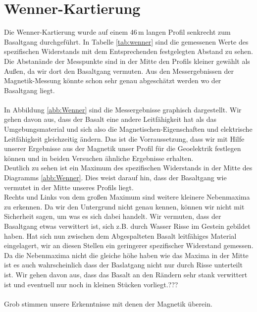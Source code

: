 

\section{Wenner-Kartierung}
Die Wenner-Kartierung wurde auf einem 46\,m langen Profil senkrecht zum Basaltgang durchgeführt. In Tabelle \ref{tab:wenner} sind die gemessenen Werte des spezifischen Widerstands mit dem Entsprechenden festgelegten Abstand zu sehen. Die Abstanände
der Messpunkte sind in der Mitte den Profils kleiner gewählt als Außen, da wir dort den Basaltgang vermuten. Aus den Messergebnissen der Magnetik-Messung könnte schon sehr genau abgeschätzt werden wo der Basaltgang liegt.\\
\\
In Abbildung \ref{abb:Wenner} sind die Messergebnisse graphisch dargestellt. Wir gehen davon aus, dass der Basalt eine andere Leitfähigkeit hat als das Umgebungsmaterial und sich also die Magnetischen-Eigenschaften und elektrische Leitfähigkeit 
gleichzeitig ändern. Das ist die Vorraussetzung, dass wir mit Hilfe unserer Ergebnisse aus der Magnetik unser Profil für die Geoelektrik festlegen können und in beiden Versuchen ähnliche Ergebnisse erhalten.\\
Deutlich zu sehen ist ein Maximum des spezifischen Widerstands in der Mitte des Diagramms \ref{abb:Wenner}.
Dies weist darauf hin, dass der Basaltgang wie vermutet in der Mitte unseres Profils liegt. \\
Rechts und Links von dem großen Maximum sind weitere kleinere Nebenmaxima zu erkennen. Da wir den Untergrund nicht genau kennen, können wir nicht mit Sicherheit sagen, um was es sich dabei handelt. Wir vermuten, dass der Basaltgang etwas verwittert 
ist, sich z.B. durch Wasser Risse im Gestein gebildet haben. Hat sich nun zwischen dem Abgespalteten Basalt leitfähiges Material eingelagert, wir an diesen Stellen ein geringerer spezifischer Widerstand gemessen.\\
Da die Nebenmaxima nicht die gleiche höhe haben wie das Maxima in der Mitte ist es auch wahrscheinlich dass der Baslatgang nicht nur durch Risse unterteilt ist. Wir gehen davon aus, dass das Basalt an den Rändern sehr stank verwittert ist und eventuell
nur noch in kleinen Stücken vorliegt.???\\
\\
Grob stimmen unsere Erkenntnisse mit denen der Magnetik überein.





